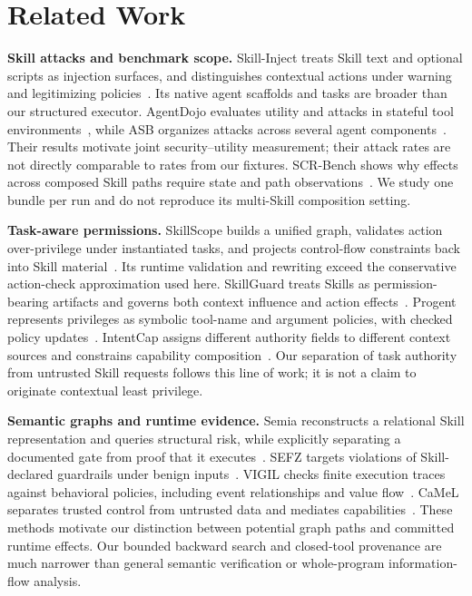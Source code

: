 \section{Related Work}
\textbf{Skill attacks and benchmark scope.} Skill-Inject treats Skill text and optional scripts as injection surfaces, and distinguishes contextual actions under warning and legitimizing policies~\cite{skillinject2026}. Its native agent scaffolds and tasks are broader than our structured executor. AgentDojo evaluates utility and attacks in stateful tool environments~\cite{agentdojo2024}, while ASB organizes attacks across several agent components~\cite{asb2024}. Their results motivate joint security--utility measurement; their attack rates are not directly comparable to rates from our fixtures. SCR-Bench shows why effects across composed Skill paths require state and path observations~\cite{scrbench2026}. We study one bundle per run and do not reproduce its multi-Skill composition setting.

\textbf{Task-aware permissions.} SkillScope builds a unified graph, validates action over-privilege under instantiated tasks, and projects control-flow constraints back into Skill material~\cite{skillscope2026}. Its runtime validation and rewriting exceed the conservative action-check approximation used here. SkillGuard treats Skills as permission-bearing artifacts and governs both context influence and action effects~\cite{skillguard2026}. Progent represents privileges as symbolic tool-name and argument policies, with checked policy updates~\cite{progent2025}. IntentCap assigns different authority fields to different context sources and constrains capability composition~\cite{intentcap2026}. Our separation of task authority from untrusted Skill requests follows this line of work; it is not a claim to originate contextual least privilege.

\textbf{Semantic graphs and runtime evidence.} Semia reconstructs a relational Skill representation and queries structural risk, while explicitly separating a documented gate from proof that it executes~\cite{semia2026}. SEFZ targets violations of Skill-declared guardrails under benign inputs~\cite{sefz2026}. VIGIL checks finite execution traces against behavioral policies, including event relationships and value flow~\cite{vigil2026}. CaMeL separates trusted control from untrusted data and mediates capabilities~\cite{camel2025}. These methods motivate our distinction between potential graph paths and committed runtime effects. Our bounded backward search and closed-tool provenance are much narrower than general semantic verification or whole-program information-flow analysis.

